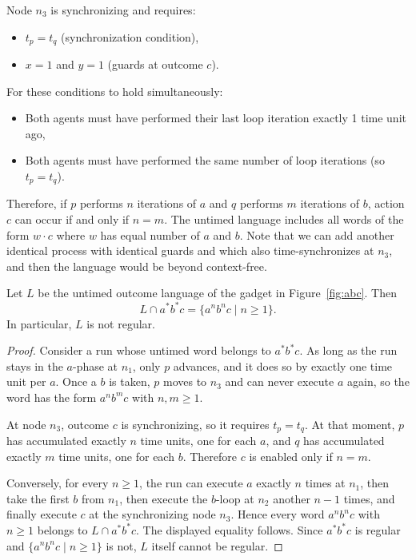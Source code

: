 \begin{example}
Node $n_3$ is synchronizing and requires:
\begin{itemize}
\item $t_p = t_q$ (synchronization condition),
\item $x = 1$ and $y = 1$ (guards at outcome $c$).
\end{itemize}

For these conditions to hold simultaneously:
\begin{itemize}
\item Both agents must have performed their last loop iteration exactly 1 time unit ago,
\item Both agents must have performed the same number of loop iterations (so $t_p = t_q$).
\end{itemize}

Therefore, if $p$ performs $n$ iterations of $a$ and $q$ performs $m$ iterations of $b$, action $c$ can occur if and only if $n = m$. The untimed language includes all words of the form $w \cdot c$ where $w$ has equal number of $a$ and $b$. Note that we can add another identical process with identical guards and which also time-synchronizes at $n_3$, and then the language would be beyond context-free.
\end{example}

\begin{proposition}
\label{prop:anbnc}
Let $L$ be the untimed outcome language of the gadget in
Figure~\ref{fig:abc}. Then
\[
L \cap a^*b^*c = \{a^n b^n c \mid n\ge 1\}.
\]
In particular, $L$ is not regular.
\end{proposition}

\begin{proof}
Consider a run whose untimed word belongs to $a^*b^*c$.  As long as the run
stays in the $a$-phase at $n_1$, only $p$ advances, and it does so by exactly
one time unit per $a$.  Once a $b$ is taken, $p$ moves to $n_3$ and can never
execute $a$ again, so the word has the form $a^n b^m c$ with $n,m\ge 1$.

At node $n_3$, outcome $c$ is synchronizing, so it requires $t_p=t_q$.  At
that moment, $p$ has accumulated exactly $n$ time units, one for each $a$, and
$q$ has accumulated exactly $m$ time units, one for each $b$.  Therefore $c$ is
enabled only if $n=m$.

Conversely, for every $n\ge 1$, the run can execute $a$ exactly $n$ times at
$n_1$, then take the first $b$ from $n_1$, then execute the $b$-loop at $n_2$
another $n-1$ times, and finally execute $c$ at the synchronizing node $n_3$.
Hence every word $a^n b^n c$ with $n\ge 1$ belongs to $L\cap a^*b^*c$.  The
displayed equality follows.  Since $a^*b^*c$ is regular and
$\{a^n b^n c \mid n\ge 1\}$ is not, $L$ itself cannot be regular.
\end{proof}

